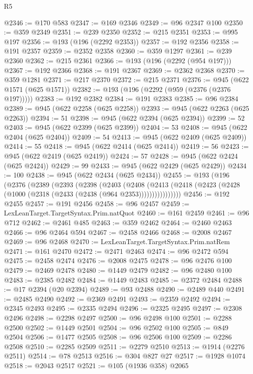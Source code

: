 \begin{lexlean}{R5}
\begin{coremodule}
@2346 := @170 @583
@2347 := @169 @2346
@2349 := @96 @2347 @100
@2350 := @359 @2349
@2351 := @239 @2350
@2352 := @215 @2351
@2353 := @995 @197
@2356 := @193 (@196 (@2292 @2353))
@2357 := @192 @2356
@2358 := @191 @2357
@2359 := @2352 @2358
@2360 := @359 @1297
@2361 := @239 @2360
@2362 := @215 @2361
@2366 := @193 (@196 (@2292 (@954 @197)))
@2367 := @192 @2366
@2368 := @191 @2367
@2369 := @2362 @2368
@2370 := @359 @1281
@2371 := @217 @2370
@2372 := @215 @2371
@2376 := @945 (@622 @1571 (@625 @1571))
@2382 := @193 (@196 (@2292 (@959 (@2376 (@2376 @197)))))
@2383 := @192 @2382
@2384 := @191 @2383
@2385 := @96 @2384
@2389 := @945 (@622 @2258 (@625 @2258))
@2393 := @945 (@622 @2263 (@625 @2263))
@2394 := 51
@2398 := @945 (@622 @2394 (@625 @2394))
@2399 := 52
@2403 := @945 (@622 @2399 (@625 @2399))
@2404 := 53
@2408 := @945 (@622 @2404 (@625 @2404))
@2409 := 54
@2413 := @945 (@622 @2409 (@625 @2409))
@2414 := 55
@2418 := @945 (@622 @2414 (@625 @2414))
@2419 := 56
@2423 := @945 (@622 @2419 (@625 @2419))
@2424 := 57
@2428 := @945 (@622 @2424 (@625 @2424))
@2429 := 99
@2433 := @945 (@622 @2429 (@625 @2429))
@2434 := 100
@2438 := @945 (@622 @2434 (@625 @2434))
@2455 := @193
    (@196
      (@2376
        (@2389
          (@2393
            (@2398
              (@2403
                (@2408
                  (@2413
                    (@2418 (@2423 (@2428 (@1000 (@2318 (@2433 (@2438 (@964 @2353))))))))))))))))
@2456 := @192 @2455
@2457 := @191 @2456
@2458 := @96 @2457
@2459 := LexLeanTarget.TargetSyntax.Prim.natQuot
@2460 := @161 @2459
@2461 := @96 @712
@2462 := @2461 @485
@2463 := @359 @2462
@2464 := @2460 @2463
@2466 := @96 @2464 @594
@2467 := @2458 @2466
@2468 := @2008 @2467
@2469 := @96 @2468
@2470 := LexLeanTarget.TargetSyntax.Prim.natRem
@2471 := @161 @2470
@2472 := @2471 @2463
@2474 := @96 @2472 @594
@2475 := @2458 @2474
@2476 := @2008 @2475
@2478 := @96 @2476 @100
@2479 := @2469 @2478
@2480 := @1449 @2479
@2482 := @96 @2480 @100
@2483 := @2385 @2482
@2484 := @1449 @2483
@2485 := @2372 @2484
@2488 := @17 @2394 (@20 @2394)
@2489 := @93 @2488
@2490 := @2489 @440
@2491 := @2485 @2490
@2492 := @2369 @2491
@2493 := @2359 @2492
@2494 := @2345 @2493
@2495 := @2335 @2494
@2496 := @2325 @2495
@2497 := @2308 @2496
@2498 := @2298 @2497
@2500 := @96 @2498 @100
@2501 := @2288 @2500
@2502 := @1449 @2501
@2504 := @96 @2502 @100
@2505 := @849 @2504
@2506 := @1477 @2505
@2508 := @96 @2506 @100
@2509 := @2286 @2508
@2510 := @2285 @2509
@2511 := @2279 @2510
@2513 := @1914 (@2276 @2511)
@2514 := @78 @2513
@2516 := @304 @827 @27
@2517 := @1928 @1074
@2518 := @2043 @2517
@2521 := @105 (@1936 @358) @2065

\end{coremodule}
\end{lexlean}
